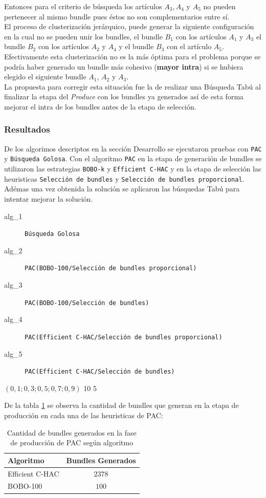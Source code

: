 Entonces para el criterio de búsqueda los artículos $A_3, A_4$ y $A_5$ no pueden pertenecer al mismo bundle pues éstos no son complementarios entre sí.\\
El proceso de clusterización jerárquico, puede generar la siguiente configuración en la cual no se pueden unir los bundles, el bundle $B_1$ con los artículos $A_1$ y $A_3$ el bundle $B_2$ con los artículos $A_2$ y $A_4$ y el bundle $B_3$ con el artículo $A_5$. Efectivamente esta clusterización no es la más óptima para el problema porque se podría haber generado un bundle más cohesivo (\textbf{mayor intra}) si se hubiera elegido el siguiente bundle $A_1$, $A_2$ y $A_3$.\\
La propuesta para corregir esta situación fue la de realizar una Búsqueda Tabú al finalizar la etapa del \textit{Produce} con los bundles ya generados así de esta forma mejorar el intra de los bundles antes de la etapa de selección.
\subsubsection{Resultados}
De los algorimos descriptos en la sección Desarrollo se ejecutaron pruebas con \texttt{PAC} y \texttt{Búsqueda Golosa}. Con el algoritmo \texttt{PAC} en la etapa de generación de bundles se utilizaron las estrategias \texttt{BOBO-k} y \texttt{Efficient C-HAC} y en la etapa de selección las heuristicas \texttt{Selección de bundles} y \texttt{Selección de bundles proporcional}. Adémas una vez obtenida la solución se aplicaron las búsquedas Tabú para intentar mejorar la solución.\\
\Solucion
{}
{
\begin{description}
	\item[alg\_1] \texttt{Búsqueda Golosa}
	\item[alg\_2] \texttt{PAC(BOBO-100/Selección de bundles proporcional)}
	\item[alg\_3] \texttt{PAC(BOBO-100/Selección de bundles)}
	\item[alg\_4] \texttt{PAC(Efficient C-HAC/Selección de bundles proporcional)}
	\item[alg\_5] \texttt{PAC(Efficient C-HAC/Selección de bundles)}
\end{description}
}
{$(0,1; 0,3; 0,5; 0,7; 0,9)$}
{10}
{5}

De la tabla \ref{res:tbl-cant-bundles} se observa la cantidad de bundles que generan en la etapa de producción en cada una de las heuristicas de PAC:\\
\begin{table}[h]
  \centering
  \resizebox{0.5\textwidth}{!} {
    \begin{tabular}{|lc|}
    \hline
    Algoritmo & Bundles Generados \\
    \hline
    Efficient C-HAC & $2378$ \\
    BOBO-100 & $100$ \\
    \hline
    \end{tabular}
  }
    \caption {Cantidad de bundles generados en la fase de producción de PAC según algoritmo}
    \label{res:tbl-cant-bundles}
\end{table}
\newpage

